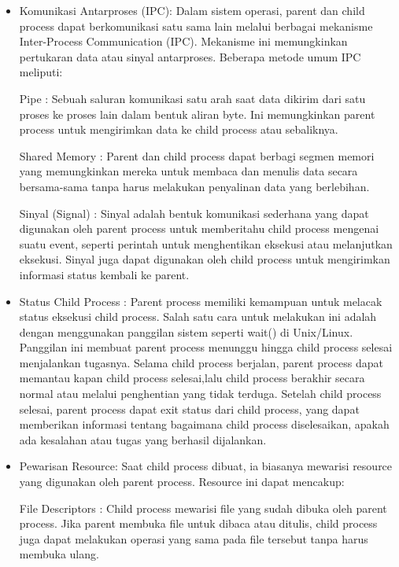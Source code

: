 \documentclass[12pt]{article}
\begin{document}
\begin{itemize}
    \item {Komunikasi Antarproses (IPC):} Dalam sistem operasi, parent dan child process dapat berkomunikasi satu sama lain melalui berbagai mekanisme Inter-Process Communication (IPC). Mekanisme ini memungkinkan pertukaran data atau sinyal antarproses. Beberapa metode umum IPC meliputi:

    
    {Pipe :} Sebuah saluran komunikasi satu arah saat data dikirim dari satu proses ke proses lain dalam bentuk aliran byte. Ini memungkinkan parent process untuk mengirimkan data ke child process atau sebaliknya.
    
    {Shared Memory :} Parent dan child process dapat berbagi segmen memori yang memungkinkan mereka untuk membaca dan menulis data secara bersama-sama tanpa harus melakukan penyalinan data yang berlebihan.
    
    {Sinyal (Signal) :} Sinyal adalah bentuk komunikasi sederhana yang dapat digunakan oleh parent process untuk memberitahu child process mengenai suatu event, seperti perintah untuk menghentikan eksekusi atau melanjutkan eksekusi. Sinyal juga dapat digunakan oleh child process untuk mengirimkan informasi status kembali ke parent.
    
    \item {Status Child Process :} Parent process memiliki kemampuan untuk melacak status eksekusi child process. Salah satu cara untuk melakukan ini adalah dengan menggunakan panggilan sistem seperti wait() di Unix/Linux. Panggilan ini membuat parent process menunggu hingga child process selesai menjalankan tugasnya. Selama child process berjalan, parent process dapat memantau kapan child process selesai,lalu child process berakhir secara normal atau melalui penghentian yang tidak terduga. Setelah child process selesai, parent process dapat exit status dari child process, yang dapat memberikan informasi tentang bagaimana child process diselesaikan, apakah ada kesalahan atau tugas yang berhasil dijalankan.
    
    \item {Pewarisan Resource:} Saat child process dibuat, ia biasanya mewarisi resource yang digunakan oleh parent process. Resource ini dapat mencakup:

    {File Descriptors :} Child process mewarisi file yang sudah dibuka oleh parent process. Jika parent membuka file untuk dibaca atau ditulis, child process juga dapat melakukan operasi yang sama pada file tersebut tanpa harus membuka ulang.
    

\end{itemize}
\end{document}
